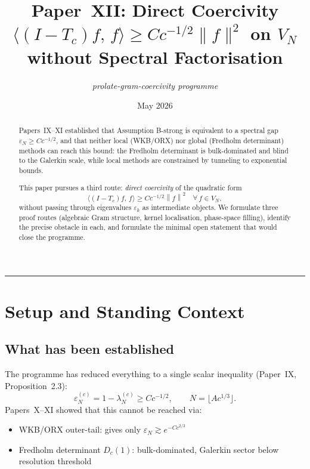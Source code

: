 \documentclass[12pt,a4paper]{article}
\title{%
  \textbf{Paper~XII: Direct Coercivity}\\[0.4em]
  \large $\langle (I - T_c)f,\, f \rangle \geq C c^{-1/2} \|f\|^2$
  on $V_N$ without Spectral Factorisation
}
\author{\textit{prolate-gram-coercivity programme}}
\date{May 2026}
\newcommand{\lam}[1]{\lambda_{#1}^{(c)}}
\newcommand{\Tc}{T_c}
\newcommand{\VN}{V_N}
\newcommand{\inner}[2]{\langle #1,\, #2 \rangle}
\newcommand{\norm}[1]{\left\|#1\right\|}
\begin{document}
\maketitle

\begin{abstract}
Papers~IX--XI established that Assumption B-strong is
equivalent to a spectral gap $\varepsilon_N \geq Cc^{-1/2}$,
and that neither local (WKB/ORX) nor global (Fredholm
determinant) methods can reach this bound:
the Fredholm determinant is bulk-dominated and blind
to the Galerkin scale, while local methods are
constrained by tunneling to exponential bounds.

\medskip\noindent
This paper pursues a third route:
\emph{direct coercivity} of the quadratic form
\[
  \boxed{
  \inner{(I - \Tc)f}{f} \geq C c^{-1/2} \norm{f}^2
  \quad \forall\, f \in \VN,}
  \tag{Coer}
\]
without passing through eigenvalues $\varepsilon_k$
as intermediate objects.
We formulate three proof routes
(algebraic Gram structure, kernel localisation,
phase-space filling),
identify the precise obstacle in each,
and formulate the minimal open statement
that would close the programme.
\end{abstract}

\tableofcontents
\bigskip\hrule\bigskip

\section{Setup and Standing Context}
\label{sec:setup}

\subsection{What has been established}

The programme has reduced everything to a single
scalar inequality (Paper~IX, Proposition~2.3):
\[
  \varepsilon_N^{(c)} = 1 - \lam{N} \geq C c^{-1/2},
  \qquad N = \lfloor A c^{1/3} \rfloor.
\]
Papers~X--XI showed that this cannot be reached via:
\begin{itemize}[nosep]
  \item WKB/ORX outer-tail: gives only
        $\varepsilon_N \gtrsim e^{-Cc^{2/3}}$
  \item Fredholm determinant $D_c(1)$: bulk-dominated,
        Galerkin sector below resolution threshold
\end{itemize}
\end{document}
